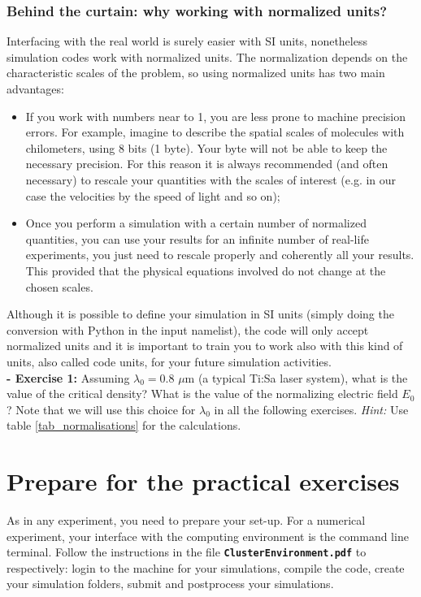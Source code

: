 \documentclass{article}
\newcommand{\commandline}[1]{\texttt{\textbf{#1}}}
\begin{document}
\subsubsection*{Behind the curtain: why working with normalized units?}
Interfacing with the real world is surely easier with SI units, nonetheless simulation codes  work with normalized units. The normalization depends on the characteristic scales of the problem, so using normalized units has two main advantages:
\begin{itemize}
\item If you work with numbers near to 1, you are less prone to machine precision errors. For example, imagine to describe the spatial scales of molecules with chilometers, using 8 bits (1 byte). Your byte will not be able to keep  the necessary precision. For this reason it is always recommended (and often necessary) to rescale your quantities with the scales of interest (e.g. in our case the velocities by the speed of light and so on);
\item Once you perform a simulation with a certain number of normalized quantities, you can use your results for an infinite number of real-life experiments, you just need to rescale properly and coherently all your results. This provided that the physical equations involved do not change at the chosen scales.
\end{itemize}

Although it is possible to define your simulation in SI units (simply doing the conversion with Python in the input namelist), the code will only accept normalized units and it is important to train you to work also with this kind of units, also called code units, for your future simulation activities. \\

\textbf{ - Exercise 1:} Assuming $\lambda_0=0.8$ $\mu$m (a typical Ti:Sa laser system), what is the value of the critical density? What is the value of the normalizing electric field $E_0$? Note that we will use this choice for $\lambda_0$ in all the following exercises. \textit{Hint:} Use table \ref{tab_normalisations} for the calculations.


\section{Prepare for the practical exercises}

As in any experiment, you need to prepare your set-up. For a numerical experiment, your interface with the computing environment is the command line terminal. Follow the instructions in the file \commandline{ClusterEnvironment.pdf} to respectively: login to the machine for your simulations, compile the code, create your simulation folders, submit and postprocess your simulations.\\
\end{document}

